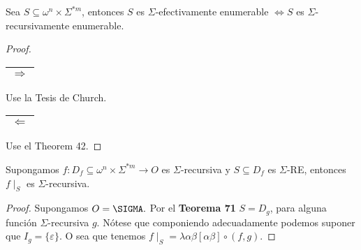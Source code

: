   \begin{theorem}
    \PN Sea $S \subseteq \omega^{n} \times \Sigma^{\ast m}$, entonces $S$ es $\Sigma$-efectivamente enumerable
    $\Leftrightarrow S$ es $\Sigma$-recursivamente enumerable.
  \end{theorem}
  \begin{proof}
    \begin{tabular}{|c|} \hline $\Rightarrow$ \\\hline \end{tabular}
    \PN Use la Tesis de Church.

    \begin{tabular}{|c|} \hline $\Leftarrow$ \\\hline \end{tabular}
    \PN Use el Theorem 42.
  \end{proof}

  \begin{corollary}
    \PN Supongamos $f: D_{f} \subseteq \omega^{n} \times \Sigma^{\ast m} \rightarrow O$ es $\Sigma$-recursiva y
    $S\subseteq D_{f}$ es $\Sigma$-RE, entonces $f \mid_{S}$ es $\Sigma$-recursiva.
  \end{corollary}
  \begin{proof}
    Supongamos $O=\SIGMA.$ Por el \textbf{Teorema 71} $S=D_{g}$, para alguna función
    $\Sigma $-recursiva $g.$ Nótese que componiendo adecuadamente podemos suponer que $I_{g}=\{\varepsilon \}.$
    O sea que tenemos $f\mid _{S}=\lambda \alpha \beta \left[ \alpha \beta \right] \circ (f,g)$.
  \end{proof}


